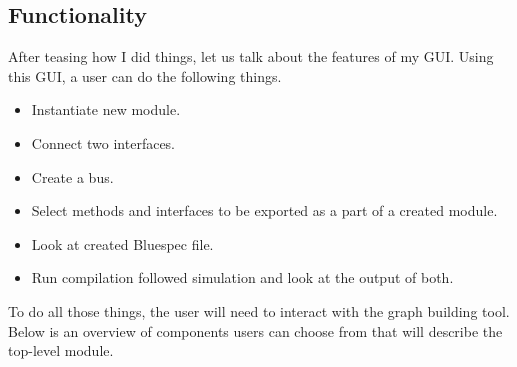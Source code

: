 \documentclass[12pt]{report}
\begin{document}
\subsection{Functionality} 
After teasing how I did things, let us talk about the features of my GUI.  
Using this GUI, a user can do the following things.  
\begin{itemize} 
   \item Instantiate new module.  
   \item Connect two interfaces. 
   \item Create a bus. 
   \item Select methods and interfaces to be exported as a part of a created module. 
   \item Look at created Bluespec file. 
   \item Run compilation followed simulation and look at the output of both.  
\end{itemize} 
To do all those things, the user will need to interact with the graph building tool. Below is an overview of components users can choose from that will describe the top-level module. 
\end{document}
